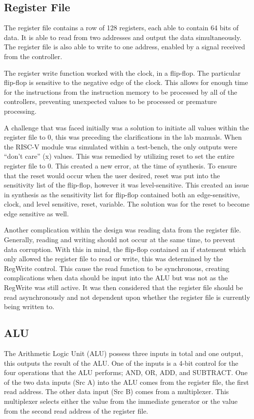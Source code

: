 \documentclass{article}
\begin{document}
\subsection{Register File}
The register file contains a row of 128 registers, each able to contain 64 bits of data. It is able to read from two addresses and output the data simultaneously. The register file is also able to write to one address, enabled by a signal received from the controller.

The register write function worked with the clock, in a flip-flop. The particular flip-flop is sensitive to the negative edge of the clock. This allows for enough time for the instructions from the instruction memory to be processed by all of the controllers, preventing unexpected values to be processed or premature processing. 

A challenge that was faced initially was a solution to initiate all values within the register file to 0, this was preceding the clarifications in the lab manuals. When the RISC-V module was simulated within a test-bench, the only outputs were ``don't care'' (x) values. This was remedied by utilizing reset to set the entire register file to 0. This created a new error, at the time of synthesis. To ensure that the reset would occur when the user desired, reset was put into the sensitivity list of the flip-flop, however it was level-sensitive. This created an issue in synthesis as the sensitivity list for flip-flop contained both an edge-sensitive, clock, and level sensitive, reset, variable. The solution was for the reset to become edge sensitive as well.

Another complication within the design was reading data from the register file. Generally, reading and writing should not occur at the same time, to prevent data corruption. With this in mind, the flip-flop contained an if statement which only allowed the register file to read or write, this was determined by the RegWrite control. This cause the read function to be synchronous, creating complications when data should be input into the ALU but was not as the RegWrite was still active. It was then considered that the register file should be read asynchronously and not dependent upon whether the register file is currently being written to.

\subsection{ALU}

The Arithmetic Logic Unit (ALU) possess three inputs in total and one output, this outputs the result of the ALU. One of the inputs is a 4-bit control for the four operations that the ALU performs; AND, OR, ADD, and SUBTRACT. One of the two data inputs (Src A) into the ALU comes from the register file, the first read address. The other data input (Src B) comes from a multiplexer. This multiplexer selects either the value from the immediate generator or the value from the second read address of the register file.
\end{document}
